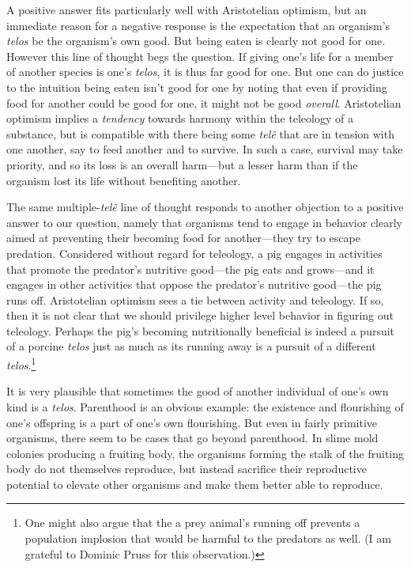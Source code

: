 A positive answer fits particularly well with Aristotelian optimism, but an immediate reason for a negative 
response is the expectation that an organism's \textit{telos} be the organism's
own good. But being eaten is clearly not good for one. However this line of thought begs the question. 
If giving one's life for a member of another species is one's \textit{telos}, it is thus far good for one.
But one can do justice to the intuition being eaten isn't good for one by noting that even if providing
food for another could be good for one, it might not be good \textit{overall}. Aristotelian optimism 
implies a \textit{tendency} towards harmony within the teleology of a substance, but is compatible with
there being some \textit{tel\^e} that are in tension with one another, say to feed another and to survive.
In such a case, survival may take priority, and so its loss is an overall harm---but a lesser harm than if
the organism lost its life without benefiting another. 

The same multiple-\textit{tel\^e} line of thought responds to another objection to a positive answer to 
our question, namely that organisms tend to engage in behavior clearly aimed at preventing their becoming
food for another---they try to escape predation. Considered without regard for teleology, a pig engages
in activities that promote the predator's nutritive good---the pig eats and grows---and it engages
in other activities that oppose the predator's nutritive good---the pig runs off. Aristotelian optimism
sees a tie between activity and teleology. If so, then it is not clear that we should privilege higher
level behavior in figuring out teleology. Perhaps the pig's becoming nutritionally beneficial is indeed
a pursuit of a porcine \textit{telos} just as much as its running away is a pursuit of a different
\textit{telos}.\footnote{One might also argue that the a prey animal's running off prevents a population
implosion that would be harmful to the predators as well. (I am grateful to Dominic Pruss for this 
observation.)}

It is very plausible that sometimes the good of another individual of one's own kind is a \textit{telos}.
Parenthood is an obvious example: the existence and flourishing of one's offspring is a part of one's
own flourishing. But even in fairly primitive organisms, there seem to be cases that go beyond parenthood.
In slime mold colonies producing a fruiting body, the organisms forming the stalk of the fruiting body do
not themselves reproduce, but instead sacrifice their reproductive potential to elevate other organisms
and make them better able to reproduce. 

